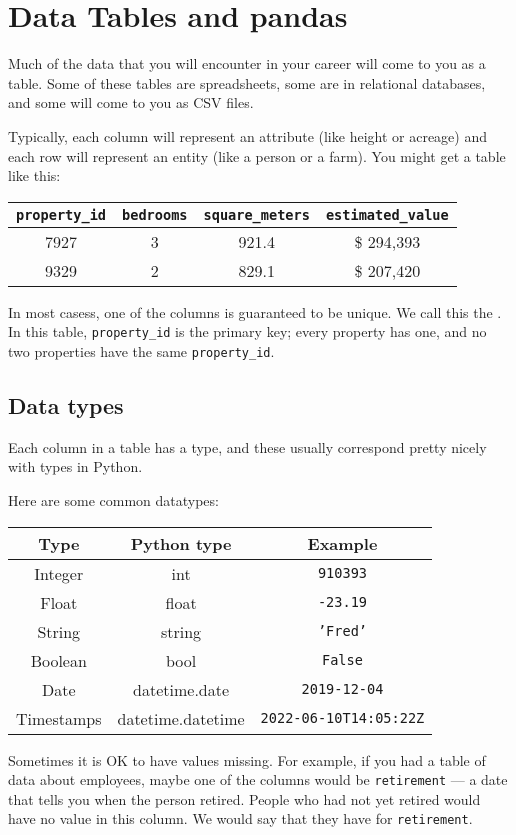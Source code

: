 \chapter{Data Tables and pandas}
Much of the data that you will encounter in your career will come to
you as a table.  Some of these tables are spreadsheets, some are in
relational databases, and some will come to you as CSV files.

Typically, each column will represent an attribute (like height or
acreage) and each row will represent an entity (like a person or a
farm). You might get a table like this:

\begin{tabular}{c | c | c | c}
  \texttt{property\_id} & \texttt{bedrooms} & \texttt{square\_meters} & \texttt{estimated\_value} \\
  \hline
  7927 &  3 & 921.4 & \$ 294,393 \\
  9329 &  2 & 829.1 & \$ 207,420 \\
\end{tabular}

In most casess, one of the columns is guaranteed to be unique. We call this
the .  In this table, \texttt{property\_id} is
the primary key; every property has one, and no two properties have
the same \texttt{property\_id}.

\section{Data types}

Each column in a table has a type, and these usually correspond pretty nicely with types in Python.

Here are some common datatypes:
\begin{tabular}{c | c | c }
  Type & Python type & Example \\
  \hline
  Integer & int & \texttt{910393} \\
  Float & float & \texttt{-23.19} \\
  String & string & \texttt{'Fred'} \\
  Boolean & bool & \texttt{False} \\
  Date & datetime.date & \texttt{2019-12-04} \\
  Timestamps & datetime.datetime & \texttt{2022-06-10T14:05:22Z} \\
\end{tabular}

Sometimes it is OK to have values missing.  For example, if you had a
table of data about employees, maybe one of the columns would be
\texttt{retirement} --- a date that tells you when the person retired.  People who
had not yet retired would have no value in this column.  We would say
that they have  for \texttt{retirement}.

